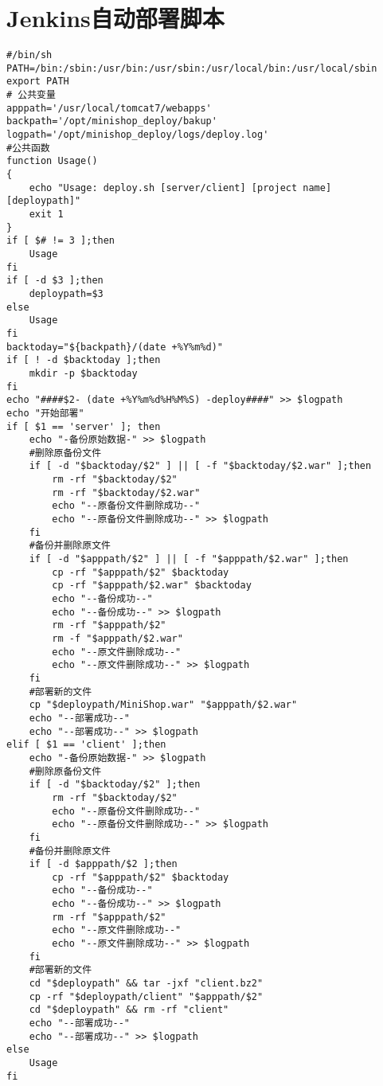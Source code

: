 \chapter{Jenkins自动部署脚本}
\label{cha:jenkinsdeploy}
\begin{lstlisting}[numbers=none]
#/bin/sh
PATH=/bin:/sbin:/usr/bin:/usr/sbin:/usr/local/bin:/usr/local/sbin
export PATH
# 公共变量
apppath='/usr/local/tomcat7/webapps'
backpath='/opt/minishop_deploy/bakup'
logpath='/opt/minishop_deploy/logs/deploy.log'
#公共函数
function Usage()
{
    echo "Usage: deploy.sh [server/client] [project name] [deploypath]"
    exit 1
}
if [ $# != 3 ];then
    Usage
fi
if [ -d $3 ];then
    deploypath=$3
else
    Usage
fi
backtoday="${backpath}/(date +%Y%m%d)"
if [ ! -d $backtoday ];then
    mkdir -p $backtoday
fi
echo "####$2- (date +%Y%m%d%H%M%S) -deploy####" >> $logpath
echo "开始部署"
if [ $1 == 'server' ]; then
    echo "-备份原始数据-" >> $logpath
    #删除原备份文件
    if [ -d "$backtoday/$2" ] || [ -f "$backtoday/$2.war" ];then
        rm -rf "$backtoday/$2"
        rm -rf "$backtoday/$2.war"
        echo "--原备份文件删除成功--"
        echo "--原备份文件删除成功--" >> $logpath
    fi
    #备份并删除原文件
    if [ -d "$apppath/$2" ] || [ -f "$apppath/$2.war" ];then
        cp -rf "$apppath/$2" $backtoday
        cp -rf "$apppath/$2.war" $backtoday
        echo "--备份成功--"
        echo "--备份成功--" >> $logpath
        rm -rf "$apppath/$2"
        rm -f "$apppath/$2.war"
        echo "--原文件删除成功--"
        echo "--原文件删除成功--" >> $logpath
    fi
    #部署新的文件
    cp "$deploypath/MiniShop.war" "$apppath/$2.war"
    echo "--部署成功--"
    echo "--部署成功--" >> $logpath
elif [ $1 == 'client' ];then
    echo "-备份原始数据-" >> $logpath
    #删除原备份文件
    if [ -d "$backtoday/$2" ];then
        rm -rf "$backtoday/$2"
        echo "--原备份文件删除成功--"
        echo "--原备份文件删除成功--" >> $logpath
    fi
    #备份并删除原文件
    if [ -d $apppath/$2 ];then
        cp -rf "$apppath/$2" $backtoday
        echo "--备份成功--"
        echo "--备份成功--" >> $logpath
        rm -rf "$apppath/$2"
        echo "--原文件删除成功--"
        echo "--原文件删除成功--" >> $logpath
    fi
    #部署新的文件
    cd "$deploypath" && tar -jxf "client.bz2"
    cp -rf "$deploypath/client" "$apppath/$2"
    cd "$deploypath" && rm -rf "client"
    echo "--部署成功--"
    echo "--部署成功--" >> $logpath
else
    Usage
fi

\end{lstlisting}